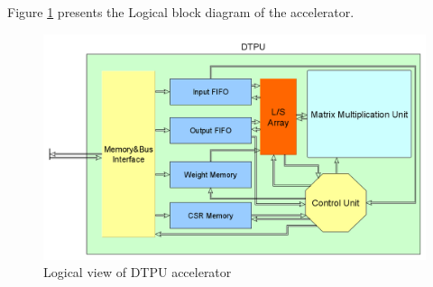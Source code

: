 Figure \ref{fig:logaccel} presents the Logical block diagram of the accelerator.
\begin{figure}[!htbp]
\centering
\captionsetup{justification=centering}
\includegraphics[scale=0.3]{./figure/logical_view.png}
\caption{Logical view of DTPU accelerator}
\label{fig:logaccel}
\end{figure}
